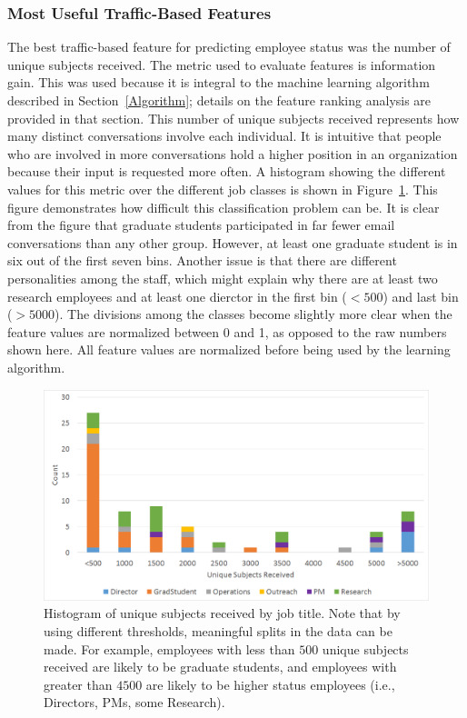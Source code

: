 \documentclass[12pt]{report}
\begin{document}
\subsubsection{Most Useful Traffic-Based Features}
The best traffic-based feature for predicting employee status was the number of unique subjects received.
The metric used to evaluate features is information gain.  This was used because it is integral to the machine learning algorithm described in Section~\ref{Algorithm}; details on the feature ranking analysis are provided in that section.
This number of unique subjects received represents how many distinct conversations involve each individual.
It is intuitive that people who are involved in more conversations hold a higher position in an organization because their input is requested more often.
A histogram showing the different values for this metric over the different job classes is shown in Figure~\ref{fig:traffic_ex_hist}.
This figure demonstrates how difficult this classification problem can be.
It is clear from the figure that graduate students participated in far fewer email conversations than any other group.
However, at least one graduate student is in six out of the first seven bins.
Another issue is that there are different personalities among the staff, which might explain why there are at least two research employees and at least one dierctor in the first bin ($<500$) and last bin ($>5000$).
The divisions among the classes become slightly more clear when the feature values are normalized between 0 and 1, as opposed to the raw numbers shown here.
All feature values are normalized before being used by the learning algorithm.
\begin{figure}[t]
    \centering
        \includegraphics[width=\columnwidth,trim={1mm 5mm 1mm 2mm},clip]{Unique_subjects_rec_hist}
        \caption[Unique subjects received histogram]{Histogram of unique subjects received by job title.  Note that by using different thresholds, meaningful splits in the data can be made.  For example, employees with less than $500$ unique subjects received are likely to be graduate students, and employees with greater than $4500$ are likely to be higher status employees (i.e., Directors, PMs, some Research).}
        \label{fig:traffic_ex_hist}
\end{figure}
\end{document}
